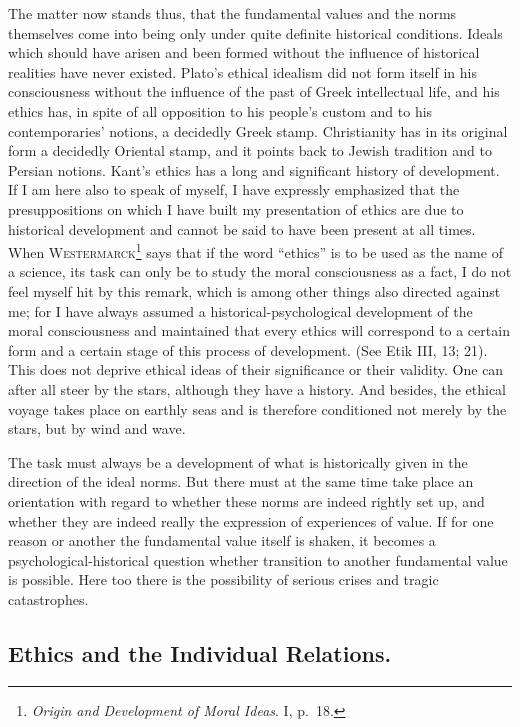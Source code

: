 \documentclass[12pt]{article}
\newcommand{\opage}[1]{\marginnote{\footnotesize\textit{[#1]}}}
\begin{document}
The matter now stands thus, that the fundamental values and the norms
themselves come into being only under quite definite historical conditions.
Ideals which should have arisen and been formed without the influence of
historical realities have never existed. Plato's ethical idealism did not
form itself in his consciousness without the influence of the past of Greek
intellectual life, and his ethics has, in spite of all opposition to his
people's custom and to his contemporaries' notions, a decidedly Greek stamp.
Christianity has in its original form a decidedly Oriental stamp, and it
points back to Jewish tradition and to Persian notions. Kant's ethics has a
long and significant history of development. If I am here also to speak of
myself, I have expressly emphasized that the presuppositions on which I have
built my presentation of ethics are due to historical development and cannot
be said to have been present at all times. When
\textsc{Westermarck}\footnote{\textit{Origin and Development of Moral
Ideas}. I, p.~18.} says that if the word ``ethics'' is to be used as the
name of a science, its task can only be to study the moral consciousness as
a fact, I do not feel myself hit by this remark, which is among other things
also directed against me; for I have always assumed a
historical-psychological development of the moral consciousness and
maintained that every ethics will correspond to a certain form and a certain
stage of this process of development. (See Etik III, 13; 21). This does not
deprive ethical ideas of their significance or their validity. One can after
all steer by the stars, although they have a history. And besides, the
ethical voyage takes place on \opage{90}earthly seas and is therefore conditioned not
merely by the stars, but by wind and wave.

The task must always be a development of what is historically given in the
direction of the ideal norms. But there must at the same time take place an
orientation with regard to whether these norms are indeed rightly set up,
and whether they are indeed really the expression of experiences of value.
If for one reason or another the fundamental value itself is shaken, it
becomes a psychological-historical question whether transition to another
fundamental value is possible. Here too there is the possibility of serious
crises and tragic catastrophes.

\subsection{Ethics and the Individual Relations.}
\label{sec:4d}
\end{document}
